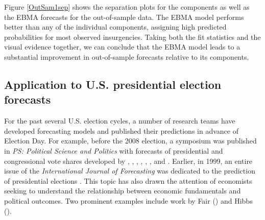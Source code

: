 \documentclass[pdftex,12pt,fullpage,oneside]{amsart}
\begin{document}

Figure \ref{OutSam1sep} shows the separation plots for the components
as well as the EBMA forecasts for the out-of-sample data.  The EBMA
model performs better than any of the individual components, assigning
high predicted probabilities for most observed insurgencies.  Taking
both the fit statistics and the visual evidence together, we can
conclude that the EBMA model leads to a substantial improvement in
out-of-sample forecasts relative to its components.




\subsection{Application to U.S. presidential election forecasts}
For the past several U.S. election cycles, a number of research teams
have developed forecasting models and published their predictions in
advance of Election Day.  For example, before the 2008 election, a
symposium was published in \emph{PS: Political Science and Politics}
with forecasts of presidential and congressional vote shares developed
by \citet{Campbell:2008}, \citet{Norpoth:2008},
\citet{Lewis-Beck:Tien:2008}, \citet{Abramowitz:2008},
\citet{Erikson:Wlezien:2008}, \citet{Holbrook:2008},
\citet{Lockerbie:2008} and \citet{Cuzan:Bundrick:2008}. Earlier, in
1999, an entire issue of the \textit{International Journal of
  Forecasting} was dedicated to the prediction of presidential
elections \citep{Brown:1999}.  This topic has also drawn the attention
of economists seeking to understand the relationship between economic
fundamentals and political outcomes.  Two prominent examples include
work by Fair (\citeyear{Fair:2010}) and Hibbs (\citeyear{Hibbs:2000}).
\end{document}
